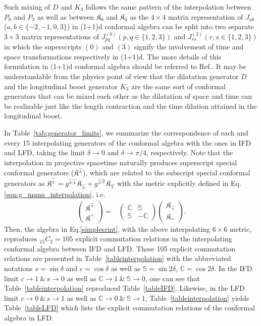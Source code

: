 \documentclass[foundations,article,submit,pdftex,moreauthors]{Definitions/mdpi}
\begin{document}
Such mixing of $D$ and $K_3$ follows the same pattern of the interpolation between $P_0$ and $P_3$ as well as between $\mathfrak{K}_0$ and $\mathfrak{K}_3$ as the $4\times 4$ matrix representation of $J_{ab}$ ($a,b \in \{-2,-1,0,3\}$) in (1+1)d conformal algebra can be split into two separate $3\times 3$ matrix representations of $J_{pq}^{(0)} (p,q \in \{1,2,3\})$ and  $J_{rs}^{(3)} (r,s \in \{1,2,3\})$ in which the superscripts $(0)$ and $(3)$ signify the involvement of time and space transformations respectively in (1+1)d. The more details of this formulation in (1+1)d conformal algebra should be referred to Ref.\cite{Ji-Hari-2026-PRD}. It may be understandable from the physics point of view that the dilatation generator $D$ and the longitudinal boost generator $K_3$ are the same sort of conformal generators that can be mixed each other as the dilatation of space and time can be realizable just like the length contraction and the time dilation attained in the longitudinal boost. 

In Table~\ref{tab:generator_limits}, we summarize the correspondence of each and every 15 interpolating generators of the conformal algebra with the ones in IFD and LFD, taking the limit $\delta \to 0$ and $\delta \to \pi/4$, respectively. 
Note that the interpolation in projective spacetime naturally produces superscript special conformal generators  ($\mathfrak{K}^{\hat{\pm}}$), which are related to the subscript special conformal generators as $\mathfrak{K}^{\hat{\pm}}=g^{\hat{\pm}\hat{\pm}}\mathfrak{K}_{\hat{\pm}}+g^{\hat{\pm}\hat{\mp}}\mathfrak{K}_{\hat{\mp}}$ with the metric explicitly defined in Eq.\eqref{eqn:g_munu_interpolation}, i.e.
\begin{align}
    \begin{pmatrix}
        \mathfrak{K}^{\hat{+}}\\
        \mathfrak{K}^{\hat{-}}
    \end{pmatrix}=&\begin{pmatrix}
        \mathbb{C}&\mathbb{S}\\
        \mathbb{S}&-\mathbb{C}
    \end{pmatrix}\begin{pmatrix}
        \mathfrak{K}_{\hat{+}}\\
        \mathfrak{K}_{\hat{-}}
    \end{pmatrix}.
\end{align}
Then, the algebra in Eq.\eqref{simplesrint}, with the above interpolating $6\times6$ metric, reproduces $_{15}C_{2} = 105$ explicit commutation relations in the interpolating conformal algebra between IFD and LFD. These 105 explicit commutation relations are 
presented in Table~\ref{tableinterpolation} with the abbreviated notations 
$s=\sin{\delta}$ and $c=\cos{\delta}$ as well as $\mathbb{S}=\sin2\delta$,  $\mathbb{C}=\cos2\delta$. In the IFD limit $c\to 1~\& \, s\to 0$ as well as 
$\mathbb{C}\rightarrow1~\&~\mathbb{S}\rightarrow0$, one can see that Table~\ref{tableinterpolation} reproduced Table~\ref{tableIFD}.  
Likewise, in the LFD limit $c\to 0~\& \, s\to 1$ as well as 
$\mathbb{C}\rightarrow0~\&~\mathbb{S}\rightarrow1$, Table~\ref{tableinterpolation} yields Table~\ref{tableLFD} which lists the explicit commutation relations of the conformal algebra in LFD. 
\end{document}
